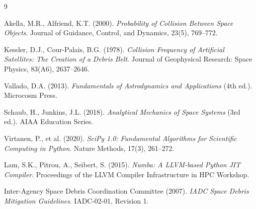 \documentclass[12pt,a4paper]{article}
\begin{document}

\begin{thebibliography}{9}

Akella, M.R., Alfriend, K.T. (2000).
\textit{Probability of Collision Between Space Objects}.
Journal of Guidance, Control, and Dynamics, 23(5), 769--772.

Kessler, D.J., Cour-Palais, B.G. (1978).
\textit{Collision Frequency of Artificial Satellites: The Creation of a Debris Belt}.
Journal of Geophysical Research: Space Physics, 83(A6), 2637--2646.

Vallado, D.A. (2013).
\textit{Fundamentals of Astrodynamics and Applications} (4th ed.).
Microcosm Press.

Schaub, H., Junkins, J.L. (2018).
\textit{Analytical Mechanics of Space Systems} (3rd ed.).
AIAA Education Series.

Virtanen, P., et al. (2020).
\textit{SciPy 1.0: Fundamental Algorithms for Scientific Computing in Python}.
Nature Methods, 17(3), 261--272.

Lam, S.K., Pitrou, A., Seibert, S. (2015).
\textit{Numba: A LLVM-based Python JIT Compiler}.
Proceedings of the LLVM Compiler Infrastructure in HPC Workshop.

Inter-Agency Space Debris Coordination Committee (2007).
\textit{IADC Space Debris Mitigation Guidelines}.
IADC-02-01, Revision 1.

\end{thebibliography}
\end{document}
